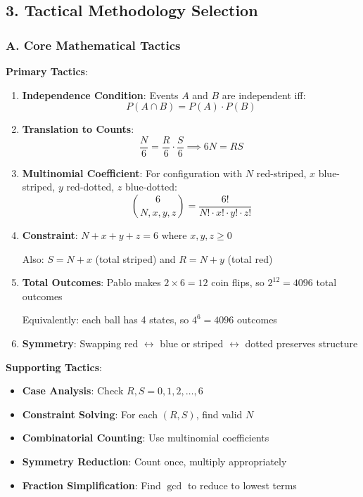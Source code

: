 \documentclass[12pt]{article}
\begin{document}
\begin{tacticalbox}
\subsection*{3. Tactical Methodology Selection}

\subsubsection*{A. Core Mathematical Tactics}

\textbf{Primary Tactics}:
\begin{enumerate}
    \item \textbf{Independence Condition}:
    Events $A$ and $B$ are independent iff:
    $$P(A \cap B) = P(A) \cdot P(B)$$
    
    \item \textbf{Translation to Counts}:
    $$\frac{N}{6} = \frac{R}{6} \cdot \frac{S}{6} \implies 6N = RS$$
    
    \item \textbf{Multinomial Coefficient}:
    For configuration with $N$ red-striped, $x$ blue-striped, $y$ red-dotted, $z$ blue-dotted:
    $$\binom{6}{N, x, y, z} = \frac{6!}{N! \cdot x! \cdot y! \cdot z!}$$
    
    \item \textbf{Constraint}:
    $N + x + y + z = 6$ where $x, y, z \geq 0$
    
    Also: $S = N + x$ (total striped) and $R = N + y$ (total red)
    
    \item \textbf{Total Outcomes}:
    Pablo makes $2 \times 6 = 12$ coin flips, so $2^{12} = 4096$ total outcomes
    
    Equivalently: each ball has 4 states, so $4^6 = 4096$ outcomes
    
    \item \textbf{Symmetry}:
    Swapping red $\leftrightarrow$ blue or striped $\leftrightarrow$ dotted preserves structure
\end{enumerate}

\textbf{Supporting Tactics}:
\begin{itemize}
    \item \textbf{Case Analysis}: Check $R, S = 0, 1, 2, \ldots, 6$
    \item \textbf{Constraint Solving}: For each $(R, S)$, find valid $N$
    \item \textbf{Combinatorial Counting}: Use multinomial coefficients
    \item \textbf{Symmetry Reduction}: Count once, multiply appropriately
    \item \textbf{Fraction Simplification}: Find $\gcd$ to reduce to lowest terms
\end{itemize}


\end{tacticalbox}
\end{document}
